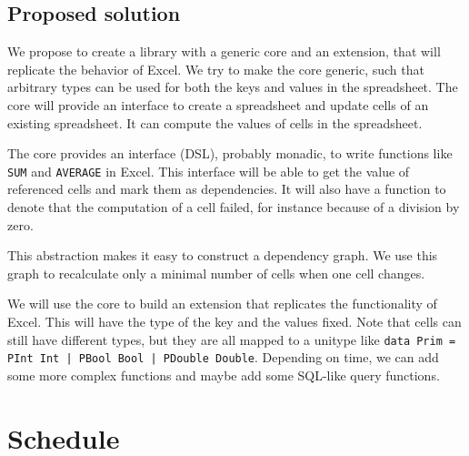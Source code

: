 \documentclass{article}
\begin{document}
	\subsection{Proposed solution}
	We propose to create a library with a generic core and an extension, that will replicate the behavior of Excel. We try to make the core generic, such that arbitrary types can be used for both the keys and values in the spreadsheet. The core will provide an interface to create a spreadsheet and update cells of an existing spreadsheet. It can compute the values of cells in the spreadsheet.
	
	The core provides an interface (DSL), probably monadic, to write functions like \texttt{SUM} and \texttt{AVERAGE} in Excel. This interface will be able to get the value of referenced cells and mark them as dependencies. It will also have a function to denote that the computation of a cell failed, for instance because of a division by zero.
	
	This abstraction makes it easy to construct a dependency graph. We use this graph to recalculate only a minimal number of cells when one cell changes.
	
	We will use the core to build an extension that replicates the functionality of Excel. This will have the type of the key and the values fixed. Note that cells can still have different types, but they are all mapped to a unitype like \texttt{data Prim = PInt Int | PBool Bool | PDouble Double}. Depending on time, we can add some more complex functions and maybe add some SQL-like query functions.
	
	\section{Schedule}
\end{document}
